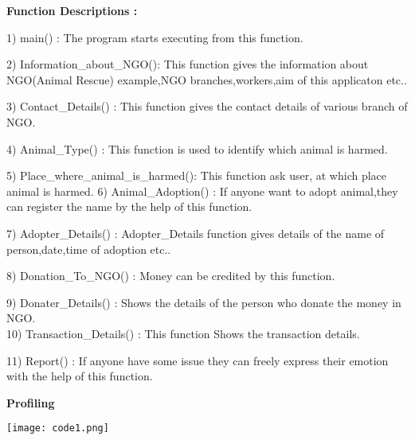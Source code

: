 \documentclass[11]{article}
\begin{document}
\begin{large}
\textbf{Function Descriptions : \vspace{0.5cm}}
\end{large}

1) main() : The program starts executing from this function.\vspace{0.25cm}

2) Information\_about\_NGO(): This function gives the information about NGO(Animal Rescue) example,NGO branches,workers,aim of this applicaton etc..\vspace{0.25cm}

3) Contact\_Details() : This function gives the contact details of various branch of NGO.\vspace{0.25cm}

4) Animal\_Type() : This function is used to identify which animal is harmed.\vspace{0.25cm}

5) Place\_where\_animal\_is\_harmed(): This function ask user, at which place animal is harmed.\vspace{0.25cm}
6) Animal\_Adoption() : If anyone want to adopt animal,they can register the name by the help of this function.\vspace{0.25cm}

7) Adopter\_Details() : Adopter\_Details function gives details of the name of person,date,time of adoption etc..\vspace{0.25cm}

8) Donation\_To\_NGO() : Money can be credited by this function.\vspace{0.25cm}

9) Donater\_Details() : Shows the details of the person who donate the money in NGO. \\\vspace{0.25cm}
10) Transaction\_Details() : This function Shows the transaction details. \vspace{0.25cm}

11) Report() : If anyone have some issue they can freely express their emotion with the help of this function.\\ \vspace{1cm}


\textbf{Profiling} \\ \vspace{1cm}


\texttt{[image: code1.png]}\\ \vspace{1cm}
\end{document}
